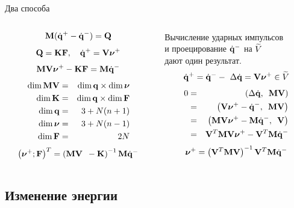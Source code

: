 \documentclass{beamer}
\begin{document}
\begin{frame}{Два способа}
    \begin{columns}
        \begin{column}{0.5\textwidth}
            \vspace{-10pt}
            $$ \eqDeltaqQ $$
            $$ \eqQKF, \quad \eqqnu $$
            $$ \eqMVnuKF $$
            \begin{eqnarray*}
                \dim \mke \cstr & = & \dim \q \times \dim \nuvec \\
                \dim \mK & = & \dim \q \times \dim \F \\
                \dim \q & = & 3 + N(n + 1) \\
                \dim \nuvec & = & 3 + N(n - 1) \\
                \dim \F & = & 2N
            \end{eqnarray*}
            \vspace{0.01pt}
            $$ \eqMVnuKFmatres $$
        \end{column}
        \begin{column}{0.5\textwidth}
            Вычисление ударных импульсов \\
            и проецирование $\dqdo$ на $\subspace$ \\
            дают один результат.
            $$ \dqposle = \dqdo -\ \deltadq = \mathbf{V}\nuposle \in \subspace $$
            \begin{eqnarray*}
                0 & = & \dotp{\deltadq}{\mke\cstr} \\
                  & = & \dotp{\cstr\nuposle - \dqdo}{\mke\cstr} \\
                  & = & \dotp{\mke\cstr\nuposle - \mke\dqdo}{\cstr} \\
                  & = & \cstr^T\mke\cstr\nuposle - \cstr^T\mke\dqdo
            \end{eqnarray*}
            \vspace{0.35pt}
            $$ \eqnuposleproj $$
        \end{column}
    \end{columns}
\end{frame}


\subsection{Изменение энергии}
\end{document}
